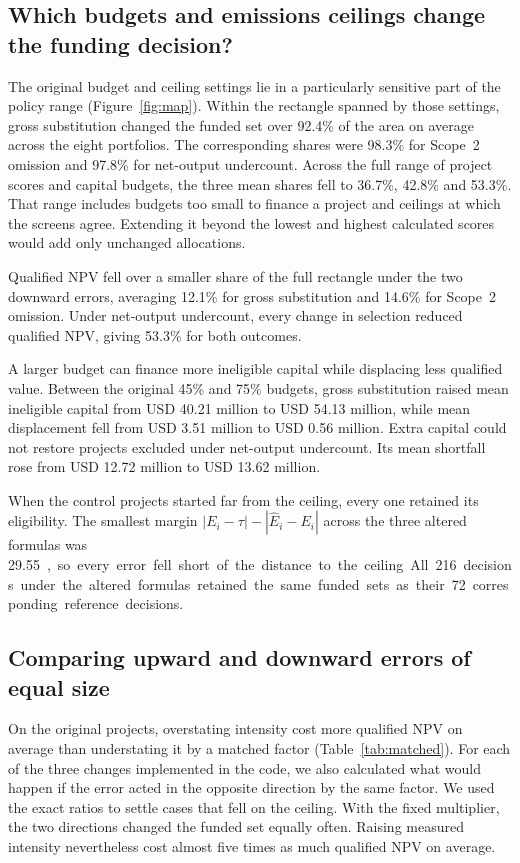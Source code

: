 \subsection{Which budgets and emissions ceilings change the funding decision?}
The original budget and ceiling settings lie in a particularly sensitive part of the policy range (Figure~\ref{fig:map}). Within the rectangle spanned by those settings, gross substitution changed the funded set over 92.4\% of the area on average across the eight portfolios. The corresponding shares were 98.3\% for Scope~2 omission and 97.8\% for net-output undercount. Across the full range of project scores and capital budgets, the three mean shares fell to 36.7\%, 42.8\% and 53.3\%. That range includes budgets too small to finance a project and ceilings at which the screens agree. Extending it beyond the lowest and highest calculated scores would add only unchanged allocations.
\ifdefined\readingcopy\fi



Qualified NPV fell over a smaller share of the full rectangle under the two downward errors, averaging 12.1\% for gross substitution and 14.6\% for Scope~2 omission. Under net-output undercount, every change in selection reduced qualified NPV, giving 53.3\% for both outcomes.

A larger budget can finance more ineligible capital while displacing less qualified value. Between the original 45\% and 75\% budgets, gross substitution raised mean ineligible capital from USD 40.21 million to USD 54.13 million, while mean displacement fell from USD 3.51 million to USD 0.56 million. Extra capital could not restore projects excluded under net-output undercount. Its mean shortfall rose from USD 12.72 million to USD 13.62 million.

When the control projects started far from the ceiling, every one retained its eligibility. The smallest margin $|E_i-\tau|-|\widehat E_i-E_i|$ across the three altered formulas was 29.55~\unit, so every error fell short of the distance to the ceiling. All 216 decisions under the altered formulas retained the same funded sets as their 72 corresponding reference decisions.

\subsection{Comparing upward and downward errors of equal size}
On the original projects, overstating intensity cost more qualified NPV on average than understating it by a matched factor (Table~\ref{tab:matched}). For each of the three changes implemented in the code, we also calculated what would happen if the error acted in the opposite direction by the same factor. We used the exact ratios to settle cases that fell on the ceiling. With the fixed multiplier, the two directions changed the funded set equally often. Raising measured intensity nevertheless cost almost five times as much qualified NPV on average.
\ifdefined\readingcopy\fi



